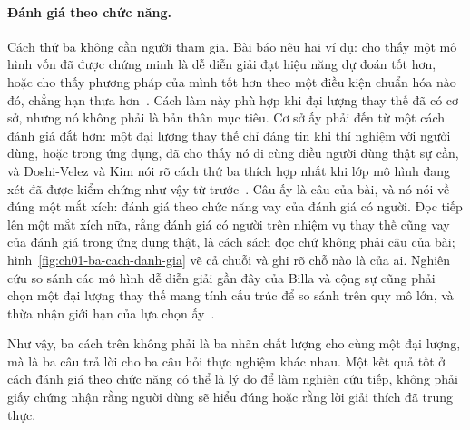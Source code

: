 \paragraph{Đánh giá theo chức năng.} Cách thứ ba không cần người tham gia.
Bài báo nêu hai ví dụ: cho thấy một mô hình vốn đã được chứng minh là dễ diễn
giải đạt hiệu năng dự đoán tốt hơn, hoặc cho thấy phương pháp của mình tốt hơn
theo một điều kiện chuẩn hóa nào đó, chẳng hạn thưa hơn~\autocite{p14rigorous}.
Cách làm này phù hợp khi đại lượng thay thế đã có cơ sở, nhưng nó không phải
là bản thân mục tiêu. Cơ sở ấy phải đến từ một cách đánh giá đắt hơn: một đại
lượng thay thế chỉ đáng tin khi thí nghiệm với người dùng, hoặc trong ứng
dụng, đã cho thấy nó đi cùng điều người dùng thật sự cần, và Doshi-Velez và
Kim nói rõ cách thứ ba thích hợp nhất khi lớp mô hình đang xét đã được kiểm
chứng như vậy từ trước~\autocite{p14rigorous}. Câu ấy là câu của bài, và nó nói
về đúng một mắt xích: đánh giá theo chức năng vay của đánh giá có người. Đọc
tiếp lên một mắt xích nữa, rằng đánh giá có người trên nhiệm vụ thay thế cũng
vay của đánh giá trong ứng dụng thật, là cách sách đọc chứ không phải câu của
bài; hình~\ref{fig:ch01-ba-cach-danh-gia} vẽ cả chuỗi và ghi rõ chỗ nào là của
ai. Nghiên cứu so sánh các mô hình dễ
diễn giải gần đây của Billa và cộng sự cũng phải chọn một đại lượng thay thế
mang tính cấu trúc để so sánh trên quy mô lớn, và thừa nhận giới hạn của lựa
chọn ấy~\autocite{p15microscope}.

Như vậy, ba cách trên không phải là ba nhãn chất lượng cho cùng một đại
lượng, mà là ba câu trả lời cho ba câu hỏi thực nghiệm khác nhau. Một kết quả
tốt ở cách đánh giá theo chức năng có thể là lý do để làm nghiên cứu tiếp,
không phải giấy chứng nhận rằng người dùng sẽ hiểu đúng hoặc rằng lời giải
thích đã trung thực.
